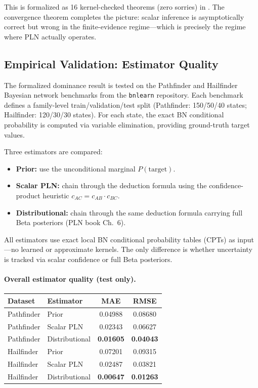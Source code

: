 \documentclass[11pt,openany]{report}
\begin{document}
This is formalized as 16 kernel-checked theorems (zero sorries) in
.
The convergence theorem completes the picture: scalar inference is
asymptotically correct but wrong in the finite-evidence regime---which
is precisely the regime where PLN actually operates.

\subsection*{Empirical Validation: Estimator Quality}
\label{sec:distrib-empirical}

The formalized dominance result is tested on the Pathfinder and Hailfinder
Bayesian network benchmarks from the \texttt{bnlearn} repository.  Each
benchmark defines a family-level train/validation/test split (Pathfinder:
150/50/40 states; Hailfinder: 120/30/30 states).  For each state, the exact
BN conditional probability is computed via variable elimination, providing
ground-truth target values.

Three estimators are compared:
\begin{itemize}
\item \textbf{Prior:} use the unconditional marginal $P(\text{target})$.
\item \textbf{Scalar PLN:} chain through the deduction formula using
  the confidence-product heuristic $c_{AC} = c_{AB} \cdot c_{BC}$.
\item \textbf{Distributional:} chain through the same deduction formula
  carrying full Beta posteriors (PLN book Ch.~6).
\end{itemize}

All estimators use exact local BN conditional probability tables
(CPTs) as input---no learned or approximate kernels.  The only
difference is whether uncertainty is tracked via scalar confidence or
full Beta posteriors.

\paragraph{Overall estimator quality (test only).}

\begin{center}
\begin{tabular}{llcc}
\toprule
\textbf{Dataset} & \textbf{Estimator} & \textbf{MAE} & \textbf{RMSE} \\
\midrule
Pathfinder & Prior        & 0.04988 & 0.08680 \\
Pathfinder & Scalar PLN   & 0.02343 & 0.06627 \\
Pathfinder & Distributional & \textbf{0.01605} & \textbf{0.04043} \\
\midrule
Hailfinder & Prior        & 0.07201 & 0.09315 \\
Hailfinder & Scalar PLN   & 0.02487 & 0.03821 \\
Hailfinder & Distributional & \textbf{0.00647} & \textbf{0.01263} \\
\bottomrule
\end{tabular}
\end{center}
\end{document}
